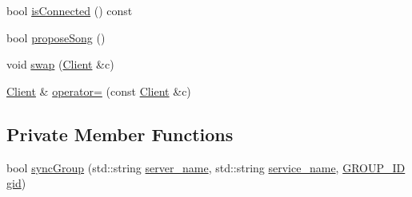 \begin{DoxyCompactItemize}
\item 
bool \hyperlink{classshaan97_1_1sync_1_1_client_a4367779edf080f835087e07b35fa6a38}{is\+Connected} () const
\item 
bool \hyperlink{classshaan97_1_1sync_1_1_client_a603ec6160f76f97fcfb41d099fdea6ab}{propose\+Song} ()
\item 
void \hyperlink{classshaan97_1_1sync_1_1_client_a6429d2c4549c9fd3074f3181923c5906}{swap} (\hyperlink{classshaan97_1_1sync_1_1_client}{Client} \&c)
\item 
\hyperlink{classshaan97_1_1sync_1_1_client}{Client} \& \hyperlink{classshaan97_1_1sync_1_1_client_a807d5ec3cc4cc0bcc3d5dec72fc3af06}{operator=} (const \hyperlink{classshaan97_1_1sync_1_1_client}{Client} \&c)
\end{DoxyCompactItemize}
\subsection*{Private Member Functions}
\begin{DoxyCompactItemize}
\item 
bool \hyperlink{classshaan97_1_1sync_1_1_client_ac3ae19ae773cf3fde376d1d984c10327}{sync\+Group} (std\+::string \hyperlink{classshaan97_1_1sync_1_1_client_a8edca95d3206d3c71bf851ad2dea7ec7}{server\+\_\+name}, std\+::string \hyperlink{classshaan97_1_1sync_1_1_client_a80e8c87abf08c599948d6464caa148e7}{service\+\_\+name}, \hyperlink{namespaceshaan97_1_1sync_a34cebf175d27dfc3d82f24608f7043c1}{G\+R\+O\+U\+P\+\_\+\+ID} \hyperlink{classshaan97_1_1sync_1_1_client_a2708c76151616ac36af4aedecee5beb1}{gid})
\end{DoxyCompactItemize}
